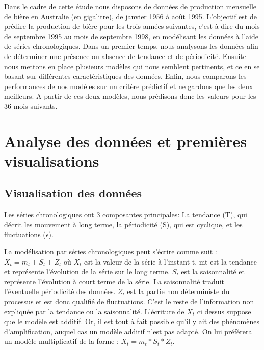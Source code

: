 \documentclass[12pt,a4paper]{book}
\newcommand{\1}{\mathds{1}}
\begin{document}
Dans le cadre de cette étude nous disposons de données de production mensuelle de bière en Australie (en gigalitre), de janvier 1956 à août 1995. L'objectif est de prédire la production de bière pour les trois années suivantes, c'est-à-dire du mois de septembre 1995 au mois de septembre 1998, en modélisant les données à l'aide de séries chronologiques.
Dans un premier temps, nous analysons les données afin de déterminer une présence ou absence de tendance et de périodicité. Ensuite nous mettons en place plusieurs modèles qui nous semblent pertinents, et ce en se basant sur différentes caractéristiques des données. Enfin, nous comparons les performances de nos modèles sur un critère prédictif et ne gardons que les deux meilleurs. A partir de ces deux modèles, nous prédisons donc les valeurs pour les 36 mois suivants.

\vspace{5 mm}


\noindent
\section{Analyse des données et premières visualisations}

\subsection{Visualisation des données}

Les séries chronologiques ont 3 composantes principales: La tendance (T), qui décrit les mouvement à long terme, la périodicité (S), qui est cyclique, et les fluctuations ($\epsilon$).
\vspace{5 mm}

La modélisation par séries chronologiques peut s'écrire comme suit : 
$X_t = m_t + S_t + Z_t $
où $X_t$ est la valeur de la série à l'instant t.
mt est la tendance et représente l'évolution de la série sur le long terme.
$S_t$ est la saisonnalité et représente l'évolution à court terme de la série. La saisonnalité traduit l'éventuelle périodicité des données.
$Z_t$ est la partie non déterministe du processus et est donc qualifié de fluctuations. C'est le reste de l'information non expliquée par la tendance ou la saisonnalité.
L'écriture de $X_t$ ci dessus suppose que le modèle est additif. Or, il est tout à fait possible qu'il y ait des phénomènes d'amplification, auquel cas un modèle additif n'est pas adapté. On lui préférera un modèle multiplicatif de la forme : $X_t = m_t*S_t*Z_t$.
\end{document}
